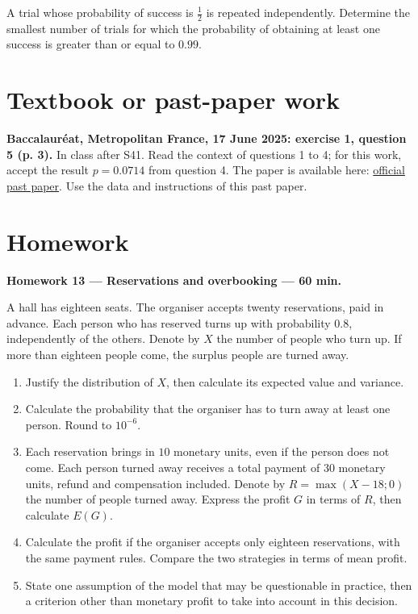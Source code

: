 A trial whose probability of success is $\frac12$ is repeated independently. Determine the smallest number of trials for which the probability of obtaining at least one success is greater than or equal to $0.99$.

\section{Textbook or past-paper work}\textbf{Baccalauréat, Metropolitan France, 17 June 2025: exercise 1, question 5 (p. 3).} In class after S41. Read the context of questions 1 to 4; for this work, accept the result $p=0.0714$ from question 4. The paper is available here: \href{https://www.education.gouv.fr/sites/default/files/2025-06/baccalaur-at-g-n-ral-2025-math-matiques-440856.pdf}{official past paper}. Use the data and instructions of this past paper.

\section{Homework}\textbf{Homework 13 --- Reservations and overbooking --- 60 min.}\par A hall has eighteen seats. The organiser accepts twenty reservations, paid in advance. Each person who has reserved turns up with probability $0.8$, independently of the others. Denote by $X$ the number of people who turn up. If more than eighteen people come, the surplus people are turned away.
\begin{enumerate}\item Justify the distribution of $X$, then calculate its expected value and variance.
\item Calculate the probability that the organiser has to turn away at least one person. Round to $10^{-6}$.
\item Each reservation brings in $10$ monetary units, even if the person does not come. Each person turned away receives a total payment of $30$ monetary units, refund and compensation included. Denote by $R=\max(X-18;0)$ the number of people turned away. Express the profit $G$ in terms of $R$, then calculate $E(G)$.
\item Calculate the profit if the organiser accepts only eighteen reservations, with the same payment rules. Compare the two strategies in terms of mean profit.
\item State one assumption of the model that may be questionable in practice, then a criterion other than monetary profit to take into account in this decision.\end{enumerate}

